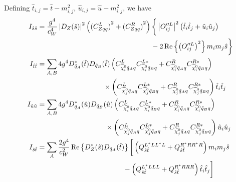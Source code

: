 \documentclass[english,notitlepage]{article}
\begin{document}
    Defining \(\hat{t}_{i, j} = \hat{t} - m_{i, j}^2\), \(\hat{u}_{i, j} = \hat{u} - m_{i, j}^2\), we have
    \begin{subequations}
        \begin{align}
            \nonumber
            I_{\hat{s}\hat{s}} & = \frac{g^4}{c_W^4} \abs{D_Z(\hat{s})}^2 \pclosed{{(C_{Zqq}^L)}^2+{(C_{Zqq}^R)}^2} \bigg\{ \abs{O_{ij}^{\prime\prime L}}^2 \pclosed{\hat{t}_i\hat{t}_j + \hat{u}_i\hat{u}_j}                                                    \\
                               & \hspace{5.7cm} - 2\Re{\pclosed{O_{ij}^{\prime\prime L}}^2} m_i m_j \hat{s} \bigg\}                                                                                                                                              \\
            \nonumber
            I_{\hat{t}\hat{t}} & = \sum_{A, B} 4 g^4 D^\ast_{\tilde{q}_A}(\hat{t}) D_{\tilde{q}_B}(\hat{t}) \pclosed{C_{\nino[i] \tilde{q}_A q}^{L} C_{\nino[i] \tilde{q}_B q}^{L\ast} + C_{\nino[i] \tilde{q}_A q}^{R} C_{\nino[i] \tilde{q}_B q}^{R\ast}} \\
                               & \hspace{3.3cm} \times \pclosed{C_{\nino[j] \tilde{q}_A q}^{L} C_{\nino[j] \tilde{q}_B q}^{L\ast} + C_{\nino[j] \tilde{q}_A q}^{R} C_{\nino[j] \tilde{q}_B q}^{R\ast}} \hat{t}_i \hat{t}_j                                       \\
            \nonumber
            I_{\hat{u}\hat{u}} & = \sum_{A, B} 4 g^4 D^\ast_{\tilde{q}_A}(\hat{u}) D_{\tilde{q}_B}(\hat{u}) \pclosed{C_{\nino[i] \tilde{q}_A q}^{L} C_{\nino[i] \tilde{q}_B q}^{L\ast} + C_{\nino[i] \tilde{q}_A q}^{R} C_{\nino[i] \tilde{q}_B q}^{R\ast}} \\
                               & \hspace{3.4cm} \times \pclosed{C_{\nino[j] \tilde{q}_A q}^{L} C_{\nino[j] \tilde{q}_B q}^{L\ast} + C_{\nino[j] \tilde{q}_A q}^{R} C_{\nino[j] \tilde{q}_B q}^{R\ast}} \hat{u}_i \hat{u}_j                                      \\
            \nonumber
            I_{\hat{s}\hat{t}} & = \sum_{A} \frac{2 g^4}{c_W^2} \Re{D^\ast_{Z}(\hat{s}) D_{\tilde{q}_A}(\hat{t})} \bigg[\pclosed{Q_{\hat{s}\hat{t}}^{L^\ast L L^\ast L} + Q_{\hat{s}\hat{t}}^{R^\ast R R^\ast R}} m_im_j \hat{s}                                 \\
                               & \hspace{4.3cm} - \pclosed{Q_{\hat{s}\hat{t}}^{L^\ast L L L} + Q_{\hat{s}\hat{t}}^{R^\ast R R R}} \hat{t}_i\hat{t}_j\bigg]                                                                                                       \\

\end{align}
\end{subequations}
\end{document}
